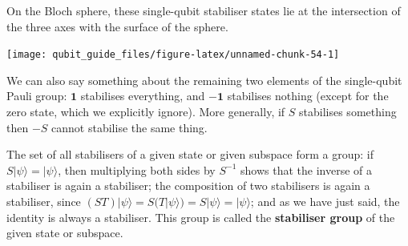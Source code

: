 \documentclass[fleqn,a4paper]{article}
\theoremstyle{definition}
\theoremstyle{definition}
\theoremstyle{definition}
\theoremstyle{definition}
\theoremstyle{remark}
\begin{document}
On the Bloch sphere, these single-qubit stabiliser states lie at the intersection of the three axes with the surface of the sphere.

\begin{center}\texttt{[image: qubit\_guide\_files/figure-latex/unnamed-chunk-54-1]} \end{center}

We can also say something about the remaining two elements of the single-qubit Pauli group: \(\mathbf{1}\) stabilises everything, and \(-\mathbf{1}\) stabilises nothing (except for the zero state, which we explicitly ignore).
More generally, if \(S\) stabilises something then \(-S\) cannot stabilise the same thing.

The set of all stabilisers of a given state or given subspace form a group: if \(S|\psi\rangle=|\psi\rangle\), then multiplying both sides by \(S^{-1}\) shows that the inverse of a stabiliser is again a stabiliser; the composition of two stabilisers is again a stabiliser, since \((ST)|\psi\rangle=S(T|\psi\rangle)=S|\psi\rangle=|\psi\rangle\); and as we have just said, the identity is always a stabiliser.
This group is called the \textbf{stabiliser group} of the given state or subspace.
\end{document}

